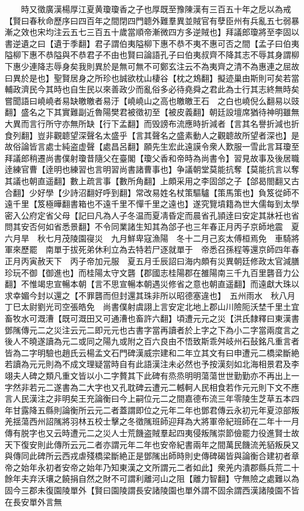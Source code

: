 　　時又徵廣漢楊厚江夏黄瓊瓊香之子也厚既至豫陳漢有三百五十年之戹以為戒【賢曰春秋命歷序曰四百年之間閉四門聼外難羣異並賊官有孽臣州有兵亂五七弱暴漸之效也宋均注云五七三百五十歲當順帝漸微四方多逆賊也】拜議郎瓊將至李固以書逆遺之曰【遺于季翻】君子謂伯夷隘柳下惠不恭不夷不惠可否之間【孟子曰伯夷隘柳下惠不恭隘與不恭君子不由也賢曰論語孔子曰伯夷叔齊不降其志不辱其身謂柳下惠少連降志辱身矣我則異於是無可無不可鄭玄注云不為夷齊之清不為惠連之屈故曰異於是也】聖賢居身之所珍也誠欲枕山棲谷【枕之鴆翻】擬迹巢由斯則可矣若當輔政濟民今其時也自生民以來善政少而亂俗多必待堯舜之君此為士行其志終無時矣嘗聞語曰嶢嶢者易缺皦皦者易汙【嶢嶢山之高也皦皦王石　之白也嶢倪么翻易以豉翻】盛名之下其實難副近魯陽樊君被徵初至【被皮義翻】朝廷設壇席猶待神明雖無大異而言行所守亦無所缺【行下孟翻】而毁謗布流應時折減者【言其名譽折減也折食列翻】豈非觀聼望深聲名太盛乎【言其聲名之盛素動人之觀聼故所望者深也】是故俗論皆言處士純盗虚聲【處昌呂翻】願先生宏此遠謨令衆人歎服一雪此言耳瓊至拜議郎稍遷尚書僕射瓊昔隨父在臺閣【瓊父香和帝時為尚書令】習見故事及後居職逹練官曹【逹明也練習也言明習尚書諸曹事也】争議朝堂莫能抗奪【莫能抗言以奪其議也朝直遥翻】數上疏言事【數所角翻】上頗采用之李固郃之子【郃曷閤翻又古合翻】少好學【少詩沼翻好呼到翻】常改易姓名杖策驅驢【策馬策也】負笈從師不遠千里【笈極曄翻書箱也不遠千里不憚千里之遠也】遂究覽墳籍為世大儒每到太學密入公府定省父母【記曰凡為人子冬温而夏凊昏定而晨省孔頴逹曰安定其牀衽也省問其安否何如省悉景翻】不令同業諸生知其為郃子也三年春正月丙子京師地震　夏六月旱　秋七月茂陵園寑災　九月鮮卑寇漁陽　冬十二月己亥太傅桓焉免　車騎將軍來歷罷　南單于拔死弟休利立為去特若尸逐就單于　帝悉召孫程等還京師四年春正月丙寅赦天下　丙子帝加元服　夏五月壬辰詔曰海内頗有災異朝廷修政太官減膳珍玩不御【御進也】而桂陽太守文礱【郡國志桂陽郡在雒陽南三千九百里礱音力公翻】不惟竭忠宣暢本朝【言不思宣暢本朝遇災修省之意也朝直遥翻】而遠獻大珠以求幸媚今封以還之【不罪礱而但封還其珠非所以昭德塞違也】　五州雨水　秋八月丁巳太尉劉光司空張皓免　尚書僕射虞詡上言安定北地上郡山川險阨沃埜千里土宜畜牧水可溉漕【既可溉田又可通漕也畜許六翻】頃遭元元之災【洪氏隸釋曰東漢書鄧隲傳元二之災注云元二即元元也古書字當再讀者於上字之下為小二字當兩度言之後人不曉遂讀為元二或同之陽九或附之百六良由不悟致斯乖舛岐州石鼔銘凡重言者皆為二字明驗也趙氏云楊孟文石門碑漢威宗建和二年立其文有曰申遭元二橋梁斷絶若讀為元元則為不成文理疑當時自有此語漢注未必然也予按漢刻如北海相景君及李翊夫人碑之類凡重文皆以小二字贅其下此碑有烝烝明明蕩蕩世世勤勤亦不再出上一字然非若元二遂書為二大字也又孔耽碑云遭元二轗軻人民相食若作元元則下文不應言人民漢注之非明矣王充論衡曰今上嗣位元二之間嘉德布流三年零陵生芝草五本四年甘露降五縣則論衡所云元二者蓋謂即位之元年二年也鄧君傳云永初元年夏涼部叛羌揺蕩西州詔隲將羽林五校士擊之冬徵隲班師迎拜為大將軍帝紀班師在二年十一月傳有脱字也又云時遭元二之災人士荒饑盗賊羣起四夷侵叛隲崇節儉罷力役進賢士故天下復安則此傳所云元二者亦謂元年二年也安帝紀書兩年之間萬民饑流羌貊叛戾又與傳同此碑所云西戎虐殘橋梁斷絶正是鄧隲出師時則史傳碑碣皆與論衡合建初者章帝之始年永初者安帝之始年乃知東漢之文所謂元二者如此】衆羌内潰郡縣兵荒二十餘年夫弃沃壤之饒捐自然之財不可謂利離河山之阻【離力智翻】守無險之處難以為固今三郡未復園陵單外【賢曰園陵謂長安諸陵園也單外謂不固余謂西漢諸陵園不皆在長安單外言無